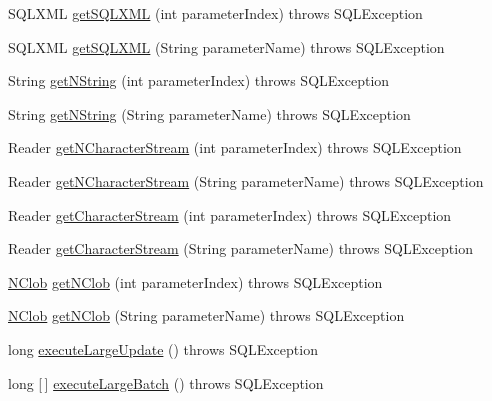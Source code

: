 \begin{DoxyCompactItemize}
\item 
S\+Q\+L\+X\+ML \mbox{\hyperlink{classcom_1_1mysql_1_1cj_1_1jdbc_1_1_callable_statement_a0029a0f89063356028ef8d795e1b2f21}{get\+S\+Q\+L\+X\+ML}} (int parameter\+Index)  throws S\+Q\+L\+Exception 
\item 
S\+Q\+L\+X\+ML \mbox{\hyperlink{classcom_1_1mysql_1_1cj_1_1jdbc_1_1_callable_statement_a6eb618a78c27c987829d5dc97d540065}{get\+S\+Q\+L\+X\+ML}} (String parameter\+Name)  throws S\+Q\+L\+Exception 
\item 
String \mbox{\hyperlink{classcom_1_1mysql_1_1cj_1_1jdbc_1_1_callable_statement_a00abcfef233b8ec80a0edb0e7daceeaa}{get\+N\+String}} (int parameter\+Index)  throws S\+Q\+L\+Exception 
\item 
String \mbox{\hyperlink{classcom_1_1mysql_1_1cj_1_1jdbc_1_1_callable_statement_a4fea844e754c85efb3d18a86f5548e34}{get\+N\+String}} (String parameter\+Name)  throws S\+Q\+L\+Exception 
\item 
Reader \mbox{\hyperlink{classcom_1_1mysql_1_1cj_1_1jdbc_1_1_callable_statement_aa96c2194c44ec4082cb2cfb645647062}{get\+N\+Character\+Stream}} (int parameter\+Index)  throws S\+Q\+L\+Exception 
\item 
Reader \mbox{\hyperlink{classcom_1_1mysql_1_1cj_1_1jdbc_1_1_callable_statement_a5dbe870e6f661092ec6985e826602f82}{get\+N\+Character\+Stream}} (String parameter\+Name)  throws S\+Q\+L\+Exception 
\item 
Reader \mbox{\hyperlink{classcom_1_1mysql_1_1cj_1_1jdbc_1_1_callable_statement_a668c7c8fd31463997dbe10c99a1e5589}{get\+Character\+Stream}} (int parameter\+Index)  throws S\+Q\+L\+Exception 
\item 
Reader \mbox{\hyperlink{classcom_1_1mysql_1_1cj_1_1jdbc_1_1_callable_statement_a5477c18b65f62729d34075e638b5e6de}{get\+Character\+Stream}} (String parameter\+Name)  throws S\+Q\+L\+Exception 
\item 
\mbox{\hyperlink{classcom_1_1mysql_1_1cj_1_1jdbc_1_1_n_clob}{N\+Clob}} \mbox{\hyperlink{classcom_1_1mysql_1_1cj_1_1jdbc_1_1_callable_statement_a1b4eadf79d2fae5dd876aac322878a6f}{get\+N\+Clob}} (int parameter\+Index)  throws S\+Q\+L\+Exception 
\item 
\mbox{\hyperlink{classcom_1_1mysql_1_1cj_1_1jdbc_1_1_n_clob}{N\+Clob}} \mbox{\hyperlink{classcom_1_1mysql_1_1cj_1_1jdbc_1_1_callable_statement_a65db28a124ce9df471a223c444a9cf22}{get\+N\+Clob}} (String parameter\+Name)  throws S\+Q\+L\+Exception 
\item 
long \mbox{\hyperlink{classcom_1_1mysql_1_1cj_1_1jdbc_1_1_callable_statement_aafb8f4a04b47a44c9eab5c384a1042e0}{execute\+Large\+Update}} ()  throws S\+Q\+L\+Exception 
\item 
long \mbox{[}$\,$\mbox{]} \mbox{\hyperlink{classcom_1_1mysql_1_1cj_1_1jdbc_1_1_callable_statement_a741debe8f395a8e49418ffa5f0996180}{execute\+Large\+Batch}} ()  throws S\+Q\+L\+Exception 
\end{DoxyCompactItemize}
